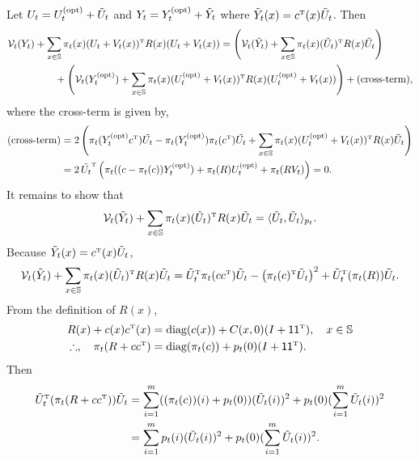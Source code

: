 \documentclass[twoside,11pt]{article}
\def\bS{\begin{slide}}
\def\clV{{\cal V}}
\def\bS{\mathbb{S}}
\def\ones{{\sf 1}}
\def\tp{{\hbox{\rm\tiny T}}}
\def\opt{{\text{\rm (opt)}}}
\begin{document}
Let $U_t = U_t^\opt + \tilde{U}_t$ and $Y_t = Y_t^\opt + \tilde{Y}_t$
where $\tilde{Y}_t(x) = c^\tp (x) \tilde{U}_t$.  Then
\begin{align*}
 \clV_t(Y_t) & +  \sum_{x\in\bS} \pi_t(x)
(U_t + V_t(x))^\tp R(x) (U_t + V_t(x))  = \left(
   \clV_t(\tilde{Y}_t) + \sum_{x\in\bS} \pi_t(x)
(\tilde{U}_t)^\tp R(x) \tilde{U}_t\right) 
\\
& \qquad +  \left( \clV_t(Y_t^\opt) + \sum_{x\in\bS} \pi_t(x)
  (U_t^\opt + V_t(x))^\tp R(x) (U_t^\opt + V_t(x)) \right) + \text{(cross-term)} ,
\end{align*}
where the cross-term is given by,
\begin{align*}
\text{(cross-term)}  &= 2\left( \pi_t( Y_t^\opt c^\tp) \tilde{U_t} - \pi_t( Y_t^\opt) \pi_t(
  c^\tp) \tilde{U_t}  + \sum_{x\in\bS} \pi_t(x) 
  (U_t^\opt + V_t(x))^\tp R(x) \tilde{U}_t \right)\\
  & = 2 \, \tilde{U_t}^\tp \left( \pi_t((c-\pi_t(c))Y_t^\opt) + \pi_t(R)
    U_t^\opt + \pi_t(R V_t) \right) = 0.
\end{align*}
It remains to show that
\begin{equation*}
\clV_t(\tilde{Y}_t) + \sum_{x\in\bS} \pi_t(x) (\tilde{U}_t)^\tp R(x)
\tilde{U}_t = \langle \tilde{U}_t,\tilde{U}_t \rangle_{p_t}.
\end{equation*}
Because $\tilde{Y}_t(x) = c^\tp (x) \tilde{U}_t$,
\begin{equation*}
\clV_t(\tilde{Y}_t) + \sum_{x\in\bS} \pi_t(x) (\tilde{U}_t)^\tp R(x)
\tilde{U}_t = \tilde{U}_t^\tp \pi_t (c c^\tp) \tilde{U}_t-
\left(\pi_t(c)^\tp \tilde{U}_t\right)^2 +  \tilde{U}_t^\tp (\pi_t(R)) \tilde{U}_t.
\end{equation*}
From the definition of $R(x)$,
\begin{align*}
  R(x) + c(x) c^\tp(x) &= \text{diag}(c(x)) + C(x,0) (I + \ones
                         \ones^\tp),\quad x\in\bS\\
  \therefore,\quad \pi_t(R+c c^\tp) &=\text{diag}(\pi_t(c)) + p_t(0) (I + \ones
                                      \ones^\tp).
\end{align*}
Then
\begin{align*}
\tilde{U}_t^\tp (\pi_t(R+c c^\tp)) \tilde{U}_t &=
                                                                     \sum_{i=1}^m
                                                                     (
                                                                     (\pi_t(c))(i)
                                                                     +
                                                                     p_t(0))
                                                                     (\tilde{U}_t(i))^2+
                                                                     p_t(0)
                                                                     (\sum_{i=1}^m
                                                                     \tilde{U}_t(i))^2
  \\
 &= \sum_{i=1}^m  p_t(i) (\tilde{U}_t(i))^2+ p_t(0) (\sum_{i=1}^m \tilde{U}_t(i))^2.    
\end{align*}
\end{document}
